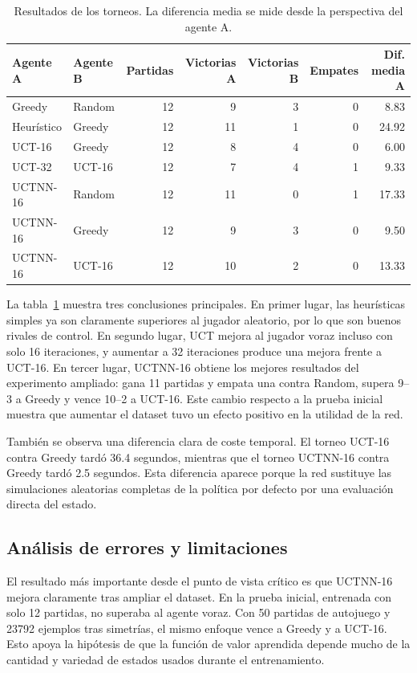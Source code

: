 \documentclass[conference,a4paper]{IEEEtran}
\begin{document}
\begin{table}[t]
\centering
\caption{Resultados de los torneos. La diferencia media se mide desde la perspectiva del agente A.}
\label{tab:torneos}
\begin{tabular}{llrrrrr}
\toprule
Agente A & Agente B & Partidas & Victorias A & Victorias B & Empates & Dif. media A \\
\midrule
Greedy & Random & 12 & 9 & 3 & 0 & 8.83 \\
Heurístico & Greedy & 12 & 11 & 1 & 0 & 24.92 \\
UCT-16 & Greedy & 12 & 8 & 4 & 0 & 6.00 \\
UCT-32 & UCT-16 & 12 & 7 & 4 & 1 & 9.33 \\
UCTNN-16 & Random & 12 & 11 & 0 & 1 & 17.33 \\
UCTNN-16 & Greedy & 12 & 9 & 3 & 0 & 9.50 \\
UCTNN-16 & UCT-16 & 12 & 10 & 2 & 0 & 13.33 \\
\bottomrule
\end{tabular}
\end{table}

La tabla~\ref{tab:torneos} muestra tres conclusiones principales. En primer
lugar, las heurísticas simples ya son claramente superiores al jugador aleatorio,
por lo que son buenos rivales de control. En segundo lugar, UCT mejora al jugador
voraz incluso con solo 16 iteraciones, y aumentar a 32 iteraciones produce una
mejora frente a UCT-16. En tercer lugar, UCTNN-16 obtiene los mejores resultados
del experimento ampliado: gana 11 partidas y empata una contra Random, supera
9--3 a Greedy y vence 10--2 a UCT-16. Este cambio respecto a la prueba inicial
muestra que aumentar el dataset tuvo un efecto positivo en la utilidad de la red.

También se observa una diferencia clara de coste temporal. El torneo UCT-16
contra Greedy tardó 36.4 segundos, mientras que el torneo UCTNN-16 contra Greedy
tardó 2.5 segundos. Esta diferencia aparece porque la red sustituye las
simulaciones aleatorias completas de la política por defecto por una evaluación
directa del estado.

\subsection{Análisis de errores y limitaciones}

El resultado más importante desde el punto de vista crítico es que UCTNN-16
mejora claramente tras ampliar el dataset. En la prueba inicial, entrenada con
solo 12 partidas, no superaba al agente voraz. Con 50 partidas de autojuego y
23792 ejemplos tras simetrías, el mismo enfoque vence a Greedy y a UCT-16. Esto
apoya la hipótesis de que la función de valor aprendida depende mucho de la
cantidad y variedad de estados usados durante el entrenamiento.
\end{document}
